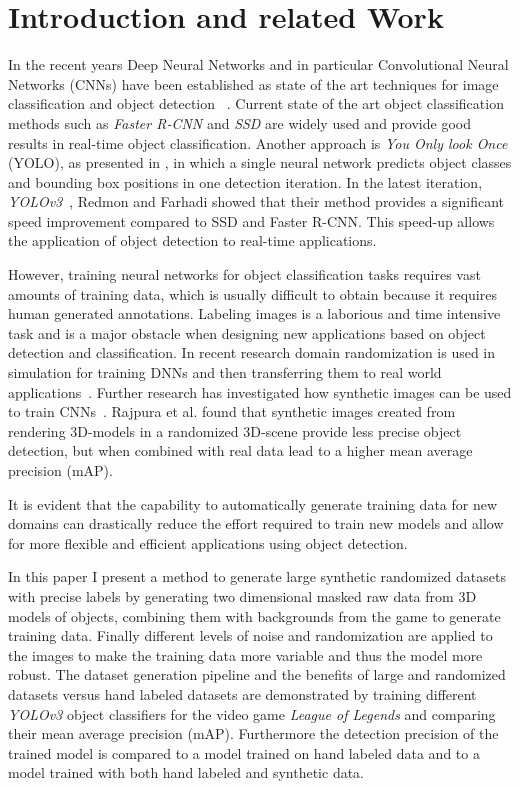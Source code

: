 \section{Introduction and related Work}
In the recent years Deep Neural Networks and in particular Convolutional Neural Networks (CNNs) have been established as state of the art techniques for image classification and object detection ~\cite{szegedy2015going,rajpura2017object}.
Current state of the art object classification methods such as \textit{Faster R-CNN} and \textit{SSD} are widely used and provide good results in real-time object classification.
Another approach is \textit{You Only look Once} (YOLO), as presented in \cite{redmon2016you}, in which a single neural network predicts object classes and bounding box positions in one detection iteration.
In the latest iteration, \textit{YOLOv3}~\cite{redmon2018yolov3}, Redmon and Farhadi showed that their method provides a significant speed improvement compared to SSD and Faster R-CNN.
This speed-up allows the application of object detection to real-time applications.

However, training neural networks for object classification tasks requires vast amounts of training data, which is usually difficult to obtain because it requires human generated annotations.
Labeling images is a laborious and time intensive task and is a major obstacle when designing new applications based on object detection and classification.
In recent research domain randomization is used in simulation for training DNNs and then transferring them to real world applications~\cite{tobin2017domain}.
Further research has investigated how synthetic images can be used to train CNNs~\cite{rajpura2017object}.
Rajpura et al. found that synthetic images created from rendering 3D-models in a randomized 3D-scene provide less precise object detection, but when combined with real data lead to a higher mean average precision (mAP).

It is evident that the capability to automatically generate training data for new domains can drastically reduce the effort required to train new models and allow for more flexible and efficient applications using object detection.

In this paper I present a method to generate large synthetic randomized datasets with precise labels by generating two dimensional masked raw data from 3D models of objects, combining them with backgrounds from the game to generate training data.
Finally different levels of noise and randomization are applied to the images to make the training data more variable and thus the model more robust.
The dataset generation pipeline and the benefits of large and randomized datasets versus hand labeled datasets are demonstrated by training different \textit{YOLOv3} object classifiers for the video game \textit{League of Legends} and comparing their mean average precision (mAP).
Furthermore the detection precision of the trained model is compared to a model trained on hand labeled data and to a model trained with both hand labeled and synthetic data.

